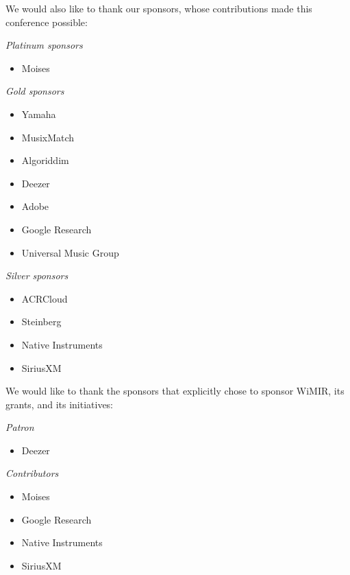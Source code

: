 We would also like to thank our sponsors, whose contributions made this conference possible:

\textit{Platinum sponsors}
\begin{itemize}\setlength{\parskip}{0pt}
    \item Moises
\end{itemize}

\textit{Gold sponsors}
\begin{multicols}{3}\raggedcolumns
\begin{itemize}\setlength{\parskip}{0pt}
    \item Yamaha
    \item MusixMatch
    \item Algoriddim
    \item Deezer
    \item Adobe
    \item Google Research
    \item Universal Music Group
\end{itemize}
\end{multicols}

\textit{Silver sponsors}
\begin{multicols}{3}\raggedcolumns
\begin{itemize}\setlength{\parskip}{0pt}
    \item ACRCloud
    \item Steinberg
    \item Native Instruments
    \item SiriusXM
\end{itemize}
\end{multicols}

We would like to thank the sponsors that explicitly chose to sponsor WiMIR, its grants, and its initiatives:

\textit{Patron}
\begin{itemize}\setlength{\parskip}{0pt}
    \item Deezer
\end{itemize}

\textit{Contributors}
\begin{multicols}{3}\raggedcolumns
\begin{itemize}\setlength{\parskip}{0pt}
    \item Moises
    \item Google Research
    \item Native Instruments
    \item SiriusXM
\end{itemize}
\end{multicols}

